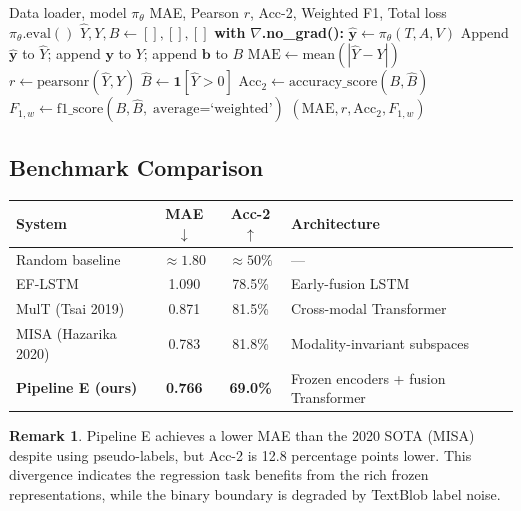 \documentclass[12pt,a4paper]{article}
\theoremstyle{definition}
\newtheorem{remark}[theorem]{Remark}
\begin{document}
\begin{algorithm}[H]
\caption{\textsc{Evaluate} — Compute All CMU-MOSI Metrics}
\label{alg:evaluate}
\begin{algorithmic}[1]
\Require Data loader, model $\pi_\theta$
\Ensure MAE, Pearson $r$, Acc-2, Weighted F1, Total loss
\State $\pi_\theta.\text{eval}()$ 
\State $\hat{Y}, Y, B \gets [], [], []$
\State \textbf{with} $\nabla$\textbf{.no\_grad():} 
  \State $\hat{\mathbf{y}} \gets \pi_\theta(T, A, V)$
  \State Append $\hat{\mathbf{y}}$ to $\hat{Y}$; append $\mathbf{y}$ to $Y$; append $\mathbf{b}$ to $B$
\EndFor
\State $\text{MAE} \gets \text{mean}(|\hat{Y} - Y|)$
\State $r \gets \text{pearsonr}(\hat{Y}, Y)$
\State $\hat{B} \gets \mathbf{1}[\hat{Y} > 0]$
\State $\text{Acc}_2 \gets \text{accuracy\_score}(B, \hat{B})$
\State $F_{1,w} \gets \text{f1\_score}(B, \hat{B},\; \text{average=`weighted'})$
\State \Return $(\text{MAE}, r, \text{Acc}_2, F_{1,w})$
\end{algorithmic}
\end{algorithm}

\subsection{Benchmark Comparison}

\begin{center}
\begin{tabular}{lccl}
\toprule
\textbf{System} & \textbf{MAE}$\downarrow$ & \textbf{Acc-2}$\uparrow$ & \textbf{Architecture} \\
\midrule
Random baseline & $\approx 1.80$ & $\approx 50\%$ & — \\
EF-LSTM & 1.090 & 78.5\% & Early-fusion LSTM \\
MulT (Tsai 2019) & 0.871 & 81.5\% & Cross-modal Transformer \\
MISA (Hazarika 2020) & 0.783 & 81.8\% & Modality-invariant subspaces \\
\midrule
\textbf{Pipeline E (ours)} & \textbf{0.766} & \textbf{69.0\%} & Frozen encoders + fusion Transformer \\
\bottomrule
\end{tabular}
\end{center}

\begin{remark}
Pipeline E achieves a lower MAE than the 2020 SOTA (MISA) despite using pseudo-labels, but Acc-2 is 12.8 percentage points lower. This divergence indicates the regression task benefits from the rich frozen representations, while the binary boundary is degraded by TextBlob label noise.
\end{remark}
\end{document}
